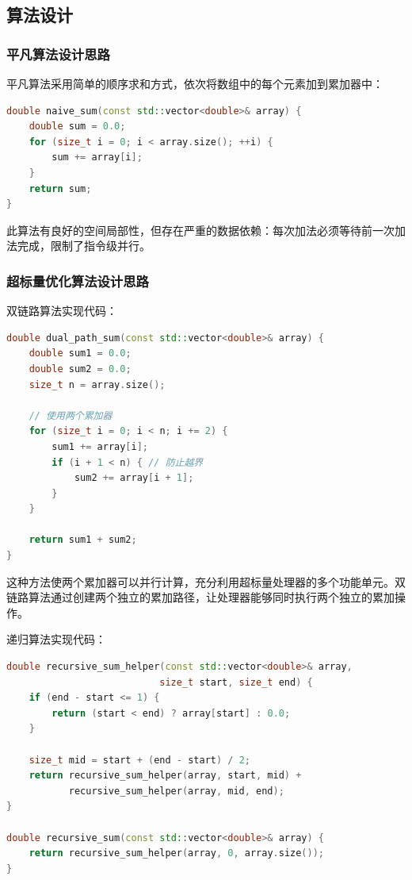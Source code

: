 \documentclass[a4paper,colorlinks=true,linkcolor=blue,urlcolor=blue,citecolor=green,bookmarks=true]{article}
\begin{document}
\subsection{算法设计}

\subsubsection{平凡算法设计思路}

平凡算法采用简单的顺序求和方式，依次将数组中的每个元素加到累加器中：

\begin{lstlisting}[language=C++]
double naive_sum(const std::vector<double>& array) {
    double sum = 0.0;
    for (size_t i = 0; i < array.size(); ++i) {
        sum += array[i];
    }
    return sum;
}
\end{lstlisting}

此算法有良好的空间局部性，但存在严重的数据依赖：每次加法必须等待前一次加法完成，限制了指令级并行。

\subsubsection{超标量优化算法设计思路}

双链路算法实现代码：

\begin{lstlisting}[language=C++]
double dual_path_sum(const std::vector<double>& array) {
    double sum1 = 0.0;
    double sum2 = 0.0;
    size_t n = array.size();
    
    // 使用两个累加器
    for (size_t i = 0; i < n; i += 2) {
        sum1 += array[i];
        if (i + 1 < n) { // 防止越界
            sum2 += array[i + 1];
        }
    }
    
    return sum1 + sum2;
}
\end{lstlisting}

这种方法使两个累加器可以并行计算，充分利用超标量处理器的多个功能单元。双链路算法通过创建两个独立的累加路径，让处理器能够同时执行两个独立的累加操作。

递归算法实现代码：

\begin{lstlisting}[language=C++]
double recursive_sum_helper(const std::vector<double>& array, 
                           size_t start, size_t end) {
    if (end - start <= 1) {
        return (start < end) ? array[start] : 0.0;
    }
    
    size_t mid = start + (end - start) / 2;
    return recursive_sum_helper(array, start, mid) + 
           recursive_sum_helper(array, mid, end);
}

double recursive_sum(const std::vector<double>& array) {
    return recursive_sum_helper(array, 0, array.size());
}
\end{lstlisting}
\end{document}
